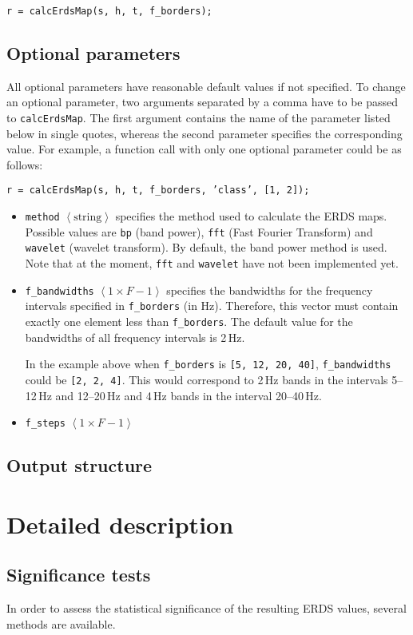\documentclass[12pt,a4paper]{article}
\begin{document}
\texttt{r = calcErdsMap(s, h, t, f\_borders);}

\subsection{Optional parameters}
All optional parameters have reasonable default values if not specified. To change an optional parameter, two arguments separated by a comma have to be passed to \texttt{calcErdsMap}. The first argument contains the name of the parameter listed below in single quotes, whereas the second parameter specifies the corresponding value. For example, a function call with only one optional parameter could be as follows:

\texttt{r = calcErdsMap(s, h, t, f\_borders, 'class', [1, 2]);}

\begin{itemize}
\item \texttt{method} $\left< \mathrm{string} \right>$ specifies the method used to calculate the ERDS maps. Possible values are \texttt{bp} (band power), \texttt{fft} (Fast Fourier Transform) and \texttt{wavelet} (wavelet transform). By default, the band power method is used. Note that at the moment, \texttt{fft} and \texttt{wavelet} have not been implemented yet.
\item \texttt{f\_bandwidths} $\left< 1 \times F-1 \right>$ specifies the bandwidths for the frequency intervals specified in \texttt{f\_borders} (in Hz). Therefore, this vector must contain exactly one element less than \texttt{f\_borders}. The default value for the bandwidths of all frequency intervals is 2\,Hz.

In the example above when \texttt{f\_borders} is \texttt{[5, 12, 20, 40]}, \texttt{f\_bandwidths} could be \texttt{[2, 2, 4]}. This would correspond to 2\,Hz bands in the intervals 5--12\,Hz and 12--20\,Hz and 4\,Hz bands in the interval 20--40\,Hz.
\item \texttt{f\_steps} $\left< 1 \times F-1 \right>$
\end{itemize}

\subsection{Output structure}

\section{Detailed description}
\subsection{Significance tests}
In order to assess the statistical significance of the resulting ERDS values, several methods are available.
\end{document}
